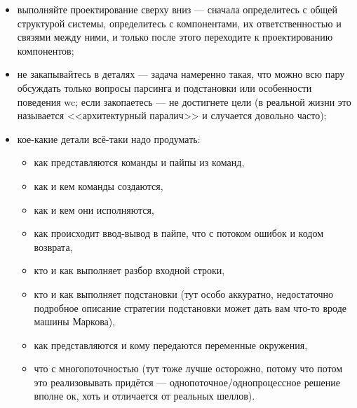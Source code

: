 \documentclass[a5paper]{article}
\begin{document}
\begin{itemize}
    \item выполняйте проектирование сверху вниз --- сначала определитесь с общей структурой системы, определитесь с компонентами, их ответственностью и связями между ними, и только после этого переходите к проектированию компонентов;
    \item не закапывайтесь в деталях --- задача намеренно такая, что можно всю пару обсуждать только вопросы парсинга и подстановки или особенности поведения wc; если закопаетесь --- не достигнете цели (в реальной жизни это называется <<архитектурный паралич>> и случается довольно часто);
    \item кое-какие детали всё-таки надо продумать:
    \begin{itemize}
        \item как представляются команды и пайпы из команд,
        \item как и кем команды создаются,
        \item как и кем они исполняются,
        \item как происходит ввод-вывод в пайпе, что с потоком ошибок и кодом возврата,
        \item кто и как выполняет разбор входной строки,
        \item кто и как выполняет подстановки (тут особо аккуратно, недостаточно подробное описание стратегии подстановки может дать вам что-то вроде машины Маркова),
        \item как представляются и кому передаются переменные окружения,
        \item что с многопоточностью (тут тоже лучше осторожно, потому что потом это реализовывать придётся --- однопоточное/однопроцессное решение вполне ок, хоть и отличается от реальных шеллов).
    \end{itemize}
\end{itemize}
\end{document}
